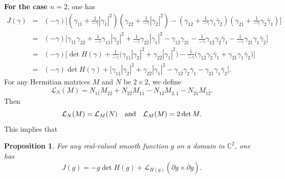 \documentclass[12pt]{amsart}
\newtheorem{proposition}{Proposition}[section]
\def\d{\partial}
\def\jbar{\overline{j}}
\def\dbar{\overline{\partial}}
\def\d{\partial}
\def\cal{\mathcal}
\begin{document}
{\bf For the case  $n=2$}, one has
\begin{eqnarray*}
J(\gamma)
&= &(-\gamma)\Big[
(\gamma_{1\bar1} + \tfrac{1}{-\gamma}|\gamma_1|^2)
(\gamma_{2\bar2} + \tfrac{1}{-\gamma}|\gamma_2|^2)  -
(\gamma_{1\bar2} + \tfrac{1}{-\gamma}\gamma_1\bar\gamma_2)
(\gamma_{2\bar1} + \tfrac{1}{-\gamma}\gamma_2\bar\gamma_1)
\Big]\\
&=& (-\gamma)\Big[
\gamma_{1\bar1}\gamma_{2\bar2}
+ \frac{1}{-\gamma}\gamma_{1\bar1}|\gamma_2|^2
+ \frac{1}{-\gamma}\gamma_{2\bar2}|\gamma_1|^2
- \gamma_{1\bar2}\gamma_{2\bar1}
 - \frac{1}{-\gamma}\gamma_{1\bar2}\gamma_2\bar\gamma_1
- \frac{1}{-\gamma}\gamma_{2\bar1}\gamma_1\bar\gamma_2
\Big]\\
&=& (-\gamma)\Big[
\det H(\gamma)+ \frac{1}{-\gamma}\big(
\gamma_{1\bar1}|\gamma_2|^2 + \gamma_{2\bar2}|\gamma_1|^2
\big)
- \frac{1}{-\gamma}\big(
\gamma_{1\bar2}\gamma_2\bar\gamma_1 + \gamma_{2\bar1}\gamma_1\bar\gamma_2
\big)
\Big]\\
&=& (-\gamma)\det H(\gamma)
+ \big[
\gamma_{1\bar1}|\gamma_2|^2 + \gamma_{2\bar2}|\gamma_1|^2
- \gamma_{1\bar2}\gamma_2\bar\gamma_1
- \gamma_{2\bar1}\gamma_1\bar\gamma_2
\big].
\end{eqnarray*}
For any Hermitian matrices $M$ and $N$ be $2\times 2$, we define
\begin{equation}
{\cal L}_N(M)=N_{1\bar1} M_{2\bar 2} +N_{2\bar2} M_{1\bar1} -N_{1\bar2} M_{2, \bar1}-N_{2\bar1} M_{1\bar2}.
\end{equation}
Then
\begin{equation}
{\cal L}_N(M)={\cal L}_M (N)\quad \hbox{and} \quad {\cal L}_M(M)=2\det M.
\end{equation}
This implies that
\begin{proposition} For any real-valued smooth function $g$ on a domain in $ \mathbb{C}^2$, one has
\begin{equation}\label{J1}
J(g)
= -g\det H(g) + {\cal L}_{H(g)}(\d g\times \dbar g).
\end{equation}
\end{proposition}
\end{document}
